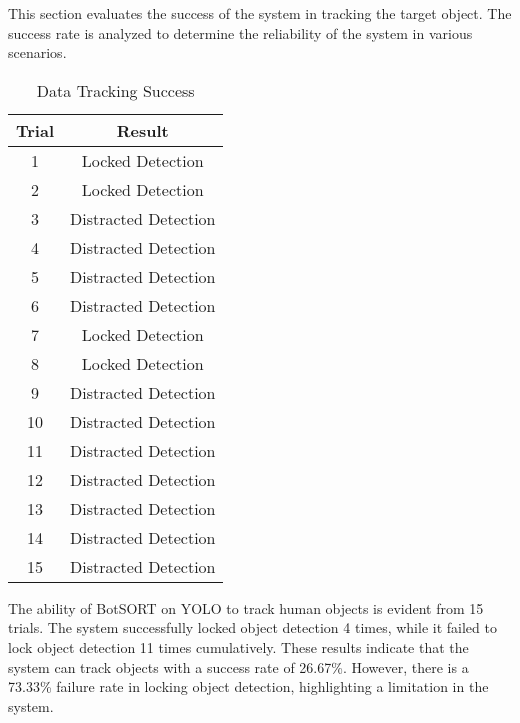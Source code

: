 This section evaluates the success of the system in tracking the target object. The success rate is analyzed to determine the reliability of the system in various scenarios.

\begin{table}[H]
    \centering
    \caption{Data Tracking Success}
    \label{tab:tracking_success}
    \begin{tabular}{|c|c|}
        \hline 
        \cellcolor[HTML]{C0C0C0}Trial & \cellcolor[HTML]{C0C0C0}Result \\ \hline
        1 & \cellcolor[HTML]{7cFF7c}Locked Detection \\ \hline
        2 & \cellcolor[HTML]{7cFF7c}Locked Detection \\ \hline
        3 & \cellcolor[HTML]{FF7c7c}Distracted Detection \\ \hline
        4 & \cellcolor[HTML]{FF7c7c}Distracted Detection \\ \hline
        5 & \cellcolor[HTML]{FF7c7c}Distracted Detection \\ \hline
        6 & \cellcolor[HTML]{FF7c7c}Distracted Detection \\ \hline
        7 & \cellcolor[HTML]{7cFF7c}Locked Detection \\ \hline
        8 & \cellcolor[HTML]{7cFF7c}Locked Detection \\ \hline
        9 & \cellcolor[HTML]{FF7c7c}Distracted Detection \\ \hline 
        10 & \cellcolor[HTML]{FF7c7c}Distracted Detection \\ \hline
        11 & \cellcolor[HTML]{FF7c7c}Distracted Detection \\ \hline
        12 & \cellcolor[HTML]{FF7c7c}Distracted Detection \\ \hline
        13 & \cellcolor[HTML]{FF7c7c}Distracted Detection \\ \hline
        14 & \cellcolor[HTML]{FF7c7c}Distracted Detection \\ \hline
        15 & \cellcolor[HTML]{FF7c7c}Distracted Detection \\ \hline
    \end{tabular}
\end{table}

The ability of BotSORT on YOLO to track human objects is evident from 15 trials. The system successfully locked object detection 4 times, while it failed to lock object detection 11 times cumulatively. These results indicate that the system can track objects with a success rate of 26.67\%. However, there is a 73.33\% failure rate in locking object detection, highlighting a limitation in the system.

